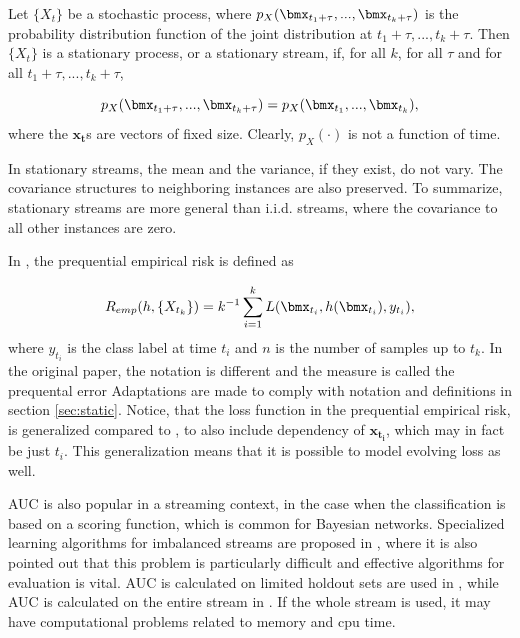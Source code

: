 Let $\{X_{t}\}$ be a stochastic process, where $p_X(\bmx_{t_1 + \tau},...,\bmx_{t_k + \tau} )$ is the probability distribution function of the joint distribution at $t_1 + \tau,...,t_k + \tau$.  Then $\{X_t\}$ is a stationary process, or a stationary stream, if, for all $k$, for all $\tau$ and for all $t_1 + \tau,...,t_k + \tau$, 

\begin{equation}
\label{eq:stationarity}
p_X(\bmx_{t_1 + \tau},...,\bmx_{t_k + \tau} ) = p_X(\bmx_{t_1},...,\bmx_{t_k} ),
\end{equation}
where the $\bm{x_t}$s are vectors of fixed size.  Clearly, $p_X(\cdot)$ is not a function of time.  

In stationary streams, the mean and the variance, if they exist, do not vary.  The covariance structures to neighboring instances are also preserved.  To summarize, stationary streams are more general than i.i.d. streams, where the covariance to all other instances are zero.  

In \cite{Gam13}, the prequential empirical risk is defined as 

\begin{equation}
\label{eq:prequentialRisk}
R_{emp}(h, \{X_{t_k}\}) = k^{-1} \sum_{i=1}^k L(\bmx_{t_i} , h(\bmx_{t_i} ), y_{t_i}),
\end{equation}
where $y_{t_i}$ is the class label at time $t_i$ and $n$ is the number of samples up to $t_k$.  In the original paper, the notation is different and the measure is called the prequental error  Adaptations are made to comply with notation and definitions in section \ref{sec:static}.  Notice, that the loss function in the prequential empirical risk, is generalized compared to \cite{Gam13}, to also include dependency of $\bm{x_{t_i}}$, which may in fact be just $t_i$.  This generalization means that it is possible to model evolving loss as well.


AUC is also popular in a streaming context, in the case when the classification is based on a scoring function, which is common for Bayesian networks. 
Specialized learning algorithms for imbalanced streams are proposed in \cite{Dit13, Hoe12, Lic10}, where it is also pointed out that this problem is particularly difficult and effective algorithms for evaluation is vital.  
AUC is calculated on limited holdout sets are used in  \cite{Dit13, Lic10}, while AUC is calculated on the entire stream in  \cite{Hoe12}. If the whole stream is used, it may have computational problems related to memory and cpu time.  

